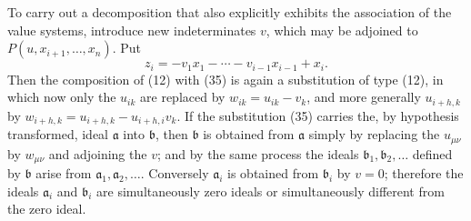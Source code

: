 \documentclass[11pt]{article}
\providecommand{\aideal}{\mathfrak a}
\providecommand{\bideal}{\mathfrak b}
\begin{document}
To carry out a decomposition that also explicitly exhibits the association of the value systems, introduce new indeterminates $v$, which may be adjoined to $P(u,x_{i+1},
\ldots,x_n)$. Put
\begin{equation}
 z_i=-v_1x_1-\cdots-v_{i-1}x_{i-1}+x_i.
\tag{35}
\end{equation}
Then the composition of (12) with (35) is again a substitution of type (12), in which now only the $u_{ik}$ are replaced by $w_{ik}=u_{ik}-v_k$, and more generally $u_{i+h,k}$ by $w_{i+h,k}=u_{i+h,k}-u_{i+h,i}v_k$. If the substitution (35) carries the, by hypothesis transformed, ideal $\aideal$ into $\bideal$, then $\bideal$ is obtained from $\aideal$ simply by replacing the $u_{\mu\nu}$ by $w_{\mu\nu}$ and adjoining the $v$; and by the same process the ideals $\bideal_1,\bideal_2,
\ldots$ defined by $\bideal$ arise from $\aideal_1,
\aideal_2,
\ldots$. Conversely $\aideal_i$ is obtained from $\bideal_i$ by $v=0$; therefore the ideals $\aideal_i$ and $\bideal_i$ are simultaneously zero ideals or simultaneously different from the zero ideal.
\end{document}
